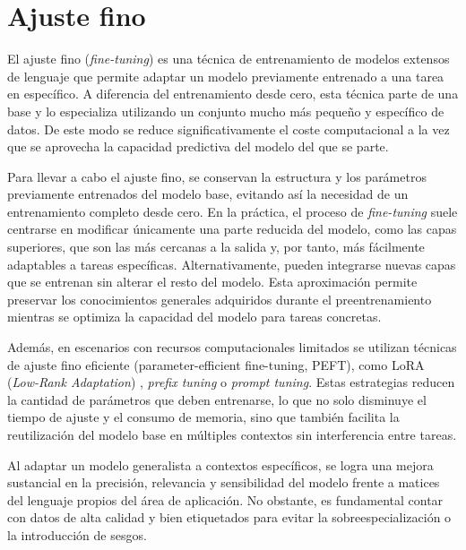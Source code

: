 \section{Ajuste fino}
El ajuste fino (\textit{fine-tuning}) \cite{howard2018universal} es una técnica de entrenamiento de modelos extensos de lenguaje 
que permite adaptar un modelo previamente entrenado a una tarea en específico.
A diferencia del entrenamiento desde cero, esta técnica parte de una base
y lo especializa utilizando un conjunto mucho más pequeño y específico de datos.
De este modo se reduce significativamente el coste computacional a la vez que se aprovecha
la capacidad predictiva del modelo del que se parte.

Para llevar a cabo el ajuste fino, se conservan la estructura y los parámetros previamente entrenados del modelo base,
evitando así la necesidad de un entrenamiento completo desde cero.
En la práctica, el proceso de \textit{fine-tuning} suele centrarse en modificar únicamente una parte reducida del modelo,
como las capas superiores, que son las más cercanas a la salida y, por tanto,
más fácilmente adaptables a tareas específicas.
Alternativamente, pueden integrarse nuevas capas que se entrenan sin alterar el resto del modelo.
Esta aproximación permite preservar los conocimientos generales adquiridos durante el preentrenamiento
mientras se optimiza la capacidad del modelo para tareas concretas.

Además, en escenarios con recursos computacionales limitados
se utilizan técnicas de ajuste fino eficiente (parameter-efficient fine-tuning, PEFT),
como LoRA (\textit{Low-Rank Adaptation}) \cite{hu2021lora},
\textit{prefix tuning} \cite{li2021prefix} o \textit{prompt tuning}.
Estas estrategias reducen la cantidad de parámetros que deben entrenarse,
lo que no solo disminuye el tiempo de ajuste y el consumo de memoria,
sino que también facilita la reutilización del modelo base en múltiples contextos sin interferencia entre tareas.

Al adaptar un modelo generalista a contextos específicos,
se logra una mejora sustancial en la precisión, relevancia y
sensibilidad del modelo frente a matices del lenguaje propios del área de aplicación.
No obstante, es fundamental contar con datos de alta calidad y
bien etiquetados para evitar la sobreespecialización o la introducción de sesgos.

\pagebreak
